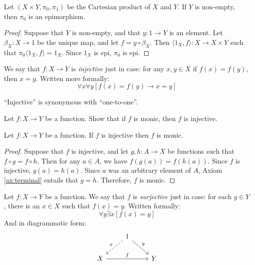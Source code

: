 \begin{prop} Let $(X\times Y,\pi _0,\pi _1)$ be the Cartesian product
  of $X$ and $Y$.  If $Y$ is non-empty, then $\pi _0$ is an
  epimorphism.  \label{proj-epi} \end{prop}

\begin{proof} Suppose that $Y$ is non-empty, and that $y:1\to Y$ is an
  element.  Let $\beta _X:X\to 1$ be the unique map, and let $f=y\circ
  \beta _X$.  Then $\langle 1_X,f\rangle :X\to X\times Y$ such that
  $\pi _0\langle 1_X,f\rangle =1_X$.  Since $1_X$ is epi, $\pi _0$ is
  epi. \end{proof}





\begin{defn} We say that $f:X\to Y$ is \emph{injective} just in case:
  for any $x,y\in X$ if $f(x)=f(y)$, then $x=y$.  Written more
  formally:
  \[ \forall x\forall y[f(x)=f(y)\to x=y ] \] \end{defn}

\begin{note} ``Injective'' is synonymous with
  ``one-to-one''. \end{note}

\begin{exercise} Let $f:X\to Y$ be a function.  Show that if $f$ is
  monic, then $f$ is injective. \end{exercise}

\begin{prop} Let $f:X\to Y$ be a function.  If $f$ is injective then
  $f$ is monic. \label{inj-mon} \end{prop}

\begin{proof} Suppose that $f$ is injective, and let $g,h:A\to X$ be
  functions such that $f\circ g=f\circ h$.  Then for any $a\in A$, we
  have $f(g(a))=f(h(a))$.  Since $f$ is injective, $g(a)=h(a)$.  Since
  $a$ was an arbitrary element of $A$, Axiom \ref{ax:terminal} entails
  that $g=h$.  Therefore, $f$ is monic. \end{proof}

\begin{defn} Let $f:X\to Y$ be a function.  We say that $f$ is
  \emph{surjective} just in case: for each $y\in Y$, there is an $x\in
  X$ such that $f(x)=y$.  Written formally:
\[ \forall y\exists x[f(x)=y] \]
And in diagrammatic form:
\[ \begin{tikzcd}
  & 1 \arrow[dashed,dl,"x"'] \arrow[dr,"y"] \\
X \arrow[rr,"f"] & & Y \end{tikzcd} \]
\end{defn}

